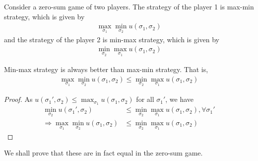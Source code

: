 \documentclass[11pt]{elegantbook}
\begin{document}
Consider a zero-sum game of two players. The strategy of the player 1 is max-min strategy, which is given by
\begin{equation}
    \begin{aligned}
        \max_{\sigma_1}\min_{\sigma_2}u(\sigma_1,\sigma_2)
    \end{aligned}
    \nonumber
\end{equation}
and the strategy of the player 2 is min-max strategy, which is given by
\begin{equation}
    \begin{aligned}
        \min_{\sigma_2}\max_{\sigma_1}u(\sigma_1,\sigma_2)
    \end{aligned}
    \nonumber
\end{equation}
\begin{proposition}
    Min-max strategy is always better than max-min strategy. That is,
    \begin{equation}
        \begin{aligned}
            \max_{\sigma_1}\min_{\sigma_2}u(\sigma_1,\sigma_2)\leq \min_{\sigma_2}\max_{\sigma_1}u(\sigma_1,\sigma_2)
        \end{aligned}
        \nonumber
    \end{equation}
\end{proposition}
\begin{proof}
    As $u(\sigma_1',\sigma_2)\leq \max_{\sigma_1}u(\sigma_1,\sigma_2)$ for all $\sigma_1'$, we have
    \begin{equation}
        \begin{aligned}
            \min_{\sigma_2}u(\sigma_1',\sigma_2)&\leq \min_{\sigma_2}\max_{\sigma_1}u(\sigma_1,\sigma_2),\forall \sigma_1'\\
            \Rightarrow \max_{\sigma_1}\min_{\sigma_2}u(\sigma_1,\sigma_2)&\leq \min_{\sigma_2}\max_{\sigma_1}u(\sigma_1,\sigma_2)
        \end{aligned}
        \nonumber
    \end{equation}
\end{proof}
We shall prove that these are in fact equal in the zero-sum game.
\end{document}
